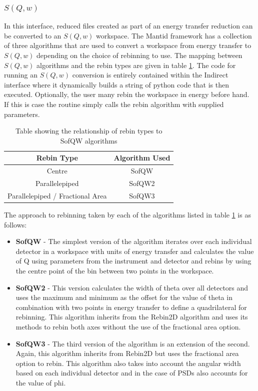 \documentclass[paper=a4, fontsize=11pt]{scrartcl}	%
\numberwithin{equation}{section}															%
\numberwithin{figure}{section}																%
\numberwithin{table}{section}																%
\begin{document}
\subsubsection{$S(Q,w)$}
\label{subsec:sofqw}
In this interface, reduced files created as part of an energy transfer reduction can be converted to an $S(Q,w)$ workspace. The Mantid framework has a collection of three algorithms that are used to convert a workspace from energy transfer to $S(Q,w)$ depending on the choice of rebinning to use. The mapping between $S(Q,w)$ algorithms and the rebin types are given in table \ref{table:sofqw-algorithms}. The code for running an $S(Q,w)$ conversion is entirely contained within the Indirect interface where it dynamically builds a string of python code that is then executed. Optionally, the user many rebin the workspace in energy before hand. If this is case the routine simply calls the rebin algorithm with supplied parameters.

\begin{table}[H]
\begin{center}
\begin{tabular}{ c c}
Rebin Type & Algorithm Used \\ \hline
Centre & SofQW \\
Parallelepiped & SofQW2 \\
Parallelepiped / Fractional Area & SofQW3 \\
\end{tabular}
\caption{Table showing the relationship of rebin types to SofQW algorithms}
\label{table:sofqw-algorithms}
\end{center}
\end{table}

The approach to rebinning taken by each of the algorithms listed in table \ref{table:sofqw-algorithms} is as follows:
\begin{itemize}
\item \textbf{SofQW} - The simplest version of the algorithm iterates over each individual detector in a workspace with units of energy transfer and calculates the value of Q using parameters from the instrument and detector and rebins by using the centre point of the bin between two points in the workspace.
\item \textbf{SofQW2} - This version calculates the width of theta over all detectors and uses the maximum and minimum as the offset for the value of theta in combination with two points in energy transfer to define a quadrilateral for rebinning. This algorithm inherits from the Rebin2D algorithm and uses its methods to rebin both axes without the use of the fractional area option.
\item \textbf{SofQW3} - The third version of the algorithm is an extension of the second. Again, this algorithm inherits from Rebin2D but uses the fractional area option to rebin. This algorithm also takes into account the angular width based on each individual detector and in the case of PSDs also accounts for the value of phi.
\end{itemize}
\end{document}
